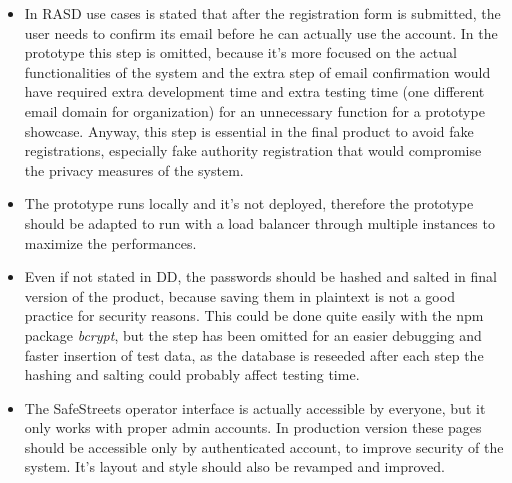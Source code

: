 \begin{itemize}
	\item In RASD use cases is stated that after the registration form is submitted, the user needs to confirm its email before he can actually use the account. In the prototype this step is omitted, because it's more focused on the actual functionalities of the system and the extra step of email confirmation would have required extra development time and extra testing time (one different email domain for organization) for an unnecessary function for a prototype showcase. Anyway, this step is essential in the final product to avoid fake registrations, especially fake authority registration that would compromise the privacy measures of the system.
	
	\item The prototype runs locally and it's not deployed, therefore the prototype should be adapted to run with a load balancer through multiple instances to maximize the performances.
	
	\item Even if not stated in DD, the passwords should be hashed and salted in final version of the product, because saving them in plaintext is not a good practice for security reasons. This could be done quite easily with the npm package \textit{bcrypt}, but the step has been omitted for an easier debugging and faster insertion of test data, as the database is reseeded after each step the hashing and salting could probably affect testing time.
	
	\item The SafeStreets operator interface is actually accessible by everyone, but it only works with proper admin accounts. In production version these pages should be accessible only by authenticated account, to improve security of the system. It's layout and style should also be revamped and improved.
\end{itemize}